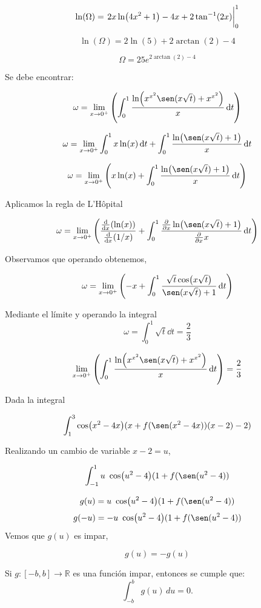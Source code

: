 {$$
\ln (\Omega)=  \eval{ 2x\ln(4x^2+1)-4x+2\tan^{-1}(2x)}_0^1 
$$

$$
\ln (\Omega)= 2\ln(5)+2\arctan(2)-4 $$

\begin{LnxRptaBox}
	$$
 \Omega=25   e^{2\arctan(2)-4}
	$$
\end{LnxRptaBox}


Se debe encontrar:


$$
\omega = \lim_{x \to 0^{+} }\pqty{ \int_0^1 \frac{\ln ( x^{x^2}\sen(x \sqrt{t})+x^{x^2} )}{x} \dd{t}}
$$

$$
\omega = \lim_{x \to 0^{+} } \int_0^1 x\ln (x) \dd{t}+\int_0^1 \frac{\ln ( \sen(x \sqrt{t})+1 )}{x} \dd{t}
$$

$$ 
\omega = \lim_{x \to 0^{+} } \pqty{x\ln (x)+\int_0^1 \frac{\ln ( \sen(x \sqrt{t})+1 )}{x} \dd{t}}
$$

Aplicamos la regla de L’Hôpital 

$$
\omega = \lim_{x \to  0^{+} } \pqty{ \frac{\dv{x}(\ln(x))}{\dv{x}(1/x)}+\int_0^1 \frac{\pdv{x}\ln ( \sen(x \sqrt{t})+1 )}{\pdv{x}x} \dd{t}}
$$

Observamos que operando obtenemos,

$$
\omega = \lim_{x \to 0^{+}} \pqty{-x +\int_0^1 \frac{\sqrt{t} \cos (x\sqrt{t}) }{\sen (x\sqrt{t}) +1}\dd{t}} 
$$

Mediante el límite y operando la integral
$$
\omega = \int_0^1 \sqrt{t} \dd{t}= \frac{2}{3}
$$



\begin{LnxRptaBox}
	$$
	\lim_{x \to 0^{+} }\pqty{ \int_0^1 \frac{\ln ( x^{x^2}\sen(x \sqrt{t})+x^{x^2} )}{x} \dd{t}} = \frac{2}{3}
	$$
\end{LnxRptaBox}



Dada la integral

$$
 \int_1^3 \cos(x^2-4x)(x+f(\sen(x^2-4x))(x-2)-2)  
$$
 
Realizando un cambio de variable $ x-2=u$,

$$
 \int_{-1}^1 u\ \cos(u^2-4)(1+f(\sen(u^2-4)) 
$$

$$
g(u)=u\ \cos(u^2-4)(1+f(\sen(u^2-4)) 
$$
 $$
 g(-u)=-u\ \cos(u^2-4)(1+f(\sen(u^2-4)) 
 $$
 Vemos que  $g(u)$ es impar,
 
 $$
 g(u)=-g(u)
 $$
 
 \begin{proposicion}
 	Si \( g: [-b,b] \to \mathbb{R} \) es una función impar, entonces se cumple que:
 	\[
 	\int_{-b}^{b} g(u) \,du = 0.
 	\]
 \end{proposicion}
 
}
